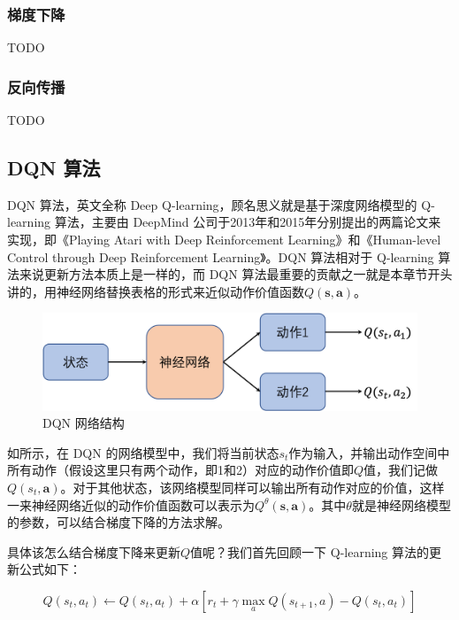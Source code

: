 \subsubsection{梯度下降}

TODO
\subsubsection{反向传播}
TODO
\subsection{ DQN 算法}

DQN 算法，英文全称 Deep Q-learning，顾名思义就是基于深度网络模型的 Q-learning 算法，主要由 DeepMind 公司于2013年和2015年分别提出的两篇论文来实现，即《Playing Atari with Deep Reinforcement Learning》和《Human-level Control through Deep Reinforcement Learning》。DQN 算法相对于 Q-learning 算法来说更新方法本质上是一样的，而 DQN 算法最重要的贡献之一就是本章节开头讲的，用神经网络替换表格的形式来近似动作价值函数$Q(\boldsymbol{s},\boldsymbol{a})$。

\begin{figure}[hbt]
    \centering
    \includegraphics[width=0.5\linewidth]{ch4/figs/dqn_network.png}
    \caption{DQN 网络结构}
    \label{fig:dqn_network}
\end{figure}

如所示，在 DQN 的网络模型中，我们将当前状态$s_t$作为输入，并输出动作空间中所有动作（假设这里只有两个动作，即1和2）对应的动作价值即$Q$值，我们记做$Q(s_t,\boldsymbol{a})$。对于其他状态，该网络模型同样可以输出所有动作对应的价值，这样一来神经网络近似的动作价值函数可以表示为$Q^{\theta}(\boldsymbol{s},\boldsymbol{a})$。其中$\theta$就是神经网络模型的参数，可以结合梯度下降的方法求解。

具体该怎么结合梯度下降来更新$Q$值呢？我们首先回顾一下 Q-learning 算法的更新公式如下：

\begin{equation}
    Q(s_t,a_t) \leftarrow Q(s_t,a_t)+\alpha[r_t+\gamma\max _{a}Q(s_{t+1},a)-Q(s_t,a_t)]
\end{equation}

